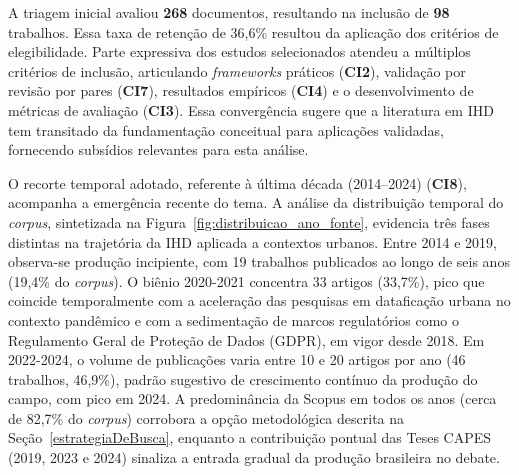 \documentclass[12pt]{article}
\begin{document}

A triagem inicial avaliou \textbf{268} documentos, resultando na inclusão de \textbf{98} trabalhos. Essa taxa de retenção de 36,6\% resultou da aplicação dos critérios de elegibilidade. Parte expressiva dos estudos selecionados atendeu a múltiplos critérios de inclusão, articulando \textit{frameworks} práticos (\textbf{CI2}), validação por revisão por pares (\textbf{CI7}), resultados empíricos (\textbf{CI4}) e o desenvolvimento de métricas de avaliação (\textbf{CI3}). Essa convergência sugere que a literatura em IHD tem transitado da fundamentação conceitual para aplicações validadas, fornecendo subsídios relevantes para esta análise.

O recorte temporal adotado, referente à última década (2014--2024) (\textbf{CI8}), acompanha a emergência recente do tema. A análise da distribuição temporal do \textit{corpus}, sintetizada na Figura~\ref{fig:distribuicao_ano_fonte}, evidencia três fases distintas na trajetória da IHD aplicada a contextos urbanos. Entre 2014 e 2019, observa-se produção incipiente, com 19 trabalhos publicados ao longo de seis anos (19,4\% do \textit{corpus}). O biênio 2020-2021 concentra 33 artigos (33,7\%), pico que coincide temporalmente com a aceleração das pesquisas em dataficação urbana no contexto pandêmico e com a sedimentação de marcos regulatórios como o Regulamento Geral de Proteção de Dados (GDPR), em vigor desde 2018. Em 2022-2024, o volume de publicações varia entre 10 e 20 artigos por ano (46 trabalhos, 46,9\%), padrão sugestivo de crescimento contínuo da produção do campo, com pico em 2024. A predominância da Scopus em todos os anos (cerca de 82,7\% do \textit{corpus}) corrobora a opção metodológica descrita na Seção~\ref{estrategiaDeBusca}, enquanto a contribuição pontual das Teses CAPES (2019, 2023 e 2024) sinaliza a entrada gradual da produção brasileira no debate.
\end{document}
